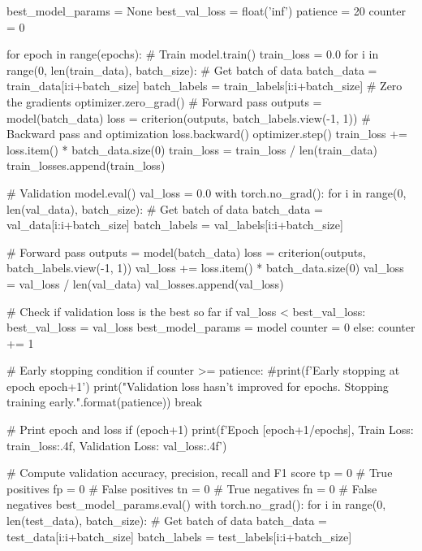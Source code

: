 \documentclass[11pt]{article}
\begin{document}
\begin{python}
best_model_params = None
best_val_loss = float('inf')
patience = 20
counter = 0

for epoch in range(epochs):
    # Train
    model.train()
    train_loss = 0.0
    for i in range(0, len(train_data), batch_size):
        # Get batch of data
        batch_data = train_data[i:i+batch_size]
        batch_labels = train_labels[i:i+batch_size]
        # Zero the gradients
        optimizer.zero_grad()
        # Forward pass
        outputs = model(batch_data)
        loss = criterion(outputs, batch_labels.view(-1, 1))
        # Backward pass and optimization
        loss.backward()
        optimizer.step()
        train_loss += loss.item() * batch_data.size(0)
    train_loss = train_loss / len(train_data)
    train_losses.append(train_loss)
    
    # Validation
    model.eval()
    val_loss = 0.0
    with torch.no_grad():
        for i in range(0, len(val_data), batch_size):
            # Get batch of data
            batch_data = val_data[i:i+batch_size]
            batch_labels = val_labels[i:i+batch_size]            

            # Forward pass
            outputs = model(batch_data)
            loss = criterion(outputs, batch_labels.view(-1, 1))
            val_loss += loss.item() * batch_data.size(0)
        val_loss = val_loss / len(val_data)
        val_losses.append(val_loss)
        
        # Check if validation loss is the best so far
        if val_loss < best_val_loss:
            best_val_loss = val_loss
            best_model_params = model
            counter = 0
        else:
            counter += 1
            
        # Early stopping condition
        if counter >= patience:
            #print(f'Early stopping at epoch {epoch+1}')
            print("Validation loss hasn't improved for {} epochs. Stopping training early.".format(patience))
            break
    
    # Print epoch and loss
    if (epoch+1) %
        print(f'Epoch [{epoch+1}/{epochs}], Train Loss: {train_loss:.4f}, Validation Loss: {val_loss:.4f}')

# Compute validation accuracy, precision, recall and F1 score
    tp = 0  # True positives
    fp = 0  # False positives
    tn = 0  # True negatives
    fn = 0  # False negatives
    best_model_params.eval()
    with torch.no_grad():
        for i in range(0, len(test_data), batch_size):
            # Get batch of data
            batch_data = test_data[i:i+batch_size]
            batch_labels = test_labels[i:i+batch_size]


\end{python}
\end{document}
